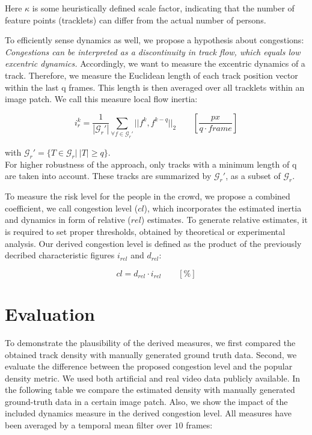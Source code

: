 \documentclass[a4paper, 10pt, journal]{wissarbIEEE}      %
\begin{document}
Here $\kappa$ is some heuristically deﬁned scale factor, indicating that the number of feature points (tracklets) can differ from the actual number of persons. 

To efficiently sense dynamics as well, we propose a hypothesis about congestions: \emph{Congestions can be interpreted as a discontinuity in track flow, which equals low excentric dynamics.} Accordingly, we want to measure the excentric dynamics of a track. Therefore, we measure the Euclidean length of each track position vector within the last q frames. This length is then averaged over all tracklets within an image patch. We call this measure local flow inertia:

\begin{equation}
	i_r^k = \frac{1}{|\mathcal{G}_r'|}\sum_{\forall f\in\mathcal{G}_r'} ||f^k, f^{k-q}||_2 \ \ \ \ \ \ \ \ \ [\frac{{px}}{q\cdot {frame}}] 
\end{equation}

with $\mathcal{G}_r′ = \{T\in\mathcal{G}_r | \ |T| \ge q\}$.\\

For higher robustness of the approach, only tracks with a minimum length of q are taken into account. These tracks are summarized by $\mathcal{G}_r′$, as a subset of $\mathcal{G}_r$.

To measure the risk level for the people in the crowd, we propose a combined coefficient, we call congestion level (${cl}$), which incorporates the estimated inertia and dynamics in form of relative (${rel}$) estimates. To generate relative estimates, it is required to set proper thresholds, obtained by theoretical or experimental analysis. Our derived congestion level is defined as the product of the previously decribed characteristic figures $i_{rel}$ and $d_{rel}$:

\begin{equation}
	{cl} = d_{rel}\cdot i_{rel} \ \ \ \ \ \ \ \ \ [\%] 
\end{equation} 

\section{Evaluation}
\label{sec:eval}

To demonstrate the plausibility of the derived measures, we first compared the obtained track density with manually generated ground truth data. Second, we evaluate the difference between the proposed congestion level and the popular density metric. We used both artiﬁcial and real video data publicly available. In the following table we compare the estimated density with manually generated ground-truth data in a certain image patch. Also, we show the impact of the included dynamics measure in the derived congestion level. All measures have been averaged by a temporal mean filter over $10$ frames:
\end{document}
